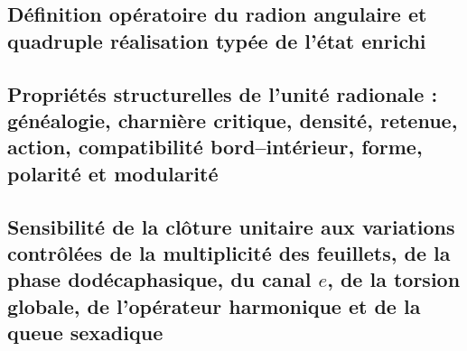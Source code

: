 \subsection{Définition opératoire du radion angulaire et quadruple réalisation typée de l'état enrichi}


\subsection{Propriétés structurelles de l'unité radionale : généalogie, charnière critique, densité, retenue, action, compatibilité bord--intérieur, forme, polarité et modularité}

\subsection{Sensibilité de la clôture unitaire aux variations contrôlées de la multiplicité des feuillets, de la phase dodécaphasique, du canal \(e\), de la torsion globale, de l'opérateur harmonique et de la queue sexadique}

